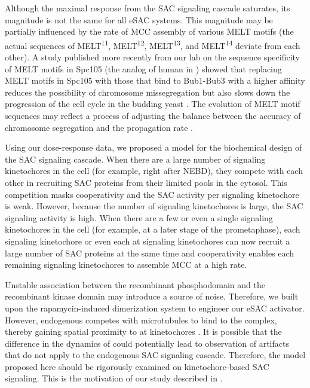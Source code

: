Although the maximal response from the SAC signaling cascade saturates, its magnitude is not the same for all eSAC systems. This magnitude may be partially influenced by the rate of MCC assembly of various MELT motifs (the actual sequences of MELT\textsuperscript{11}, MELT\textsuperscript{12}, MELT\textsuperscript{13}, and MELT\textsuperscript{14} deviate from each other). A study published more recently from our lab on the sequence specificity of MELT motifs in Spc105 (the analog of human  in ) showed that replacing MELT motifs in Spc105 with those that bind to Bub1-Bub3 with a higher affinity reduces the possibility of chromosome missegregation but also slows down the progression of the cell cycle in the budding yeast \cite{YeastMELTSpecificity}. The evolution of MELT motif sequences may reflect a process of adjusting the balance between the accuracy of chromosome segregation and the propagation rate \cite{MELTEvolution}.

Using our dose-response data, we proposed a model for the biochemical design of the SAC signaling cascade. When there are a large number of signaling kinetochores in the cell (for example, right after NEBD), they compete with each other in recruiting SAC proteins from their limited pools in the cytosol. This competition masks cooperativity and the SAC activity per signaling kinetochore is weak. However, because the number of signaling kinetochores is large, the SAC signaling activity is high. When there are a few or even a single signaling kinetochores in the cell (for example, at a later stage of the prometaphase), each signaling kinetochore or even each  at signaling kinetochores can now recruit a large number of SAC proteins at the same time and cooperativity enables each remaining signaling kinetochores to assemble MCC at a high rate.

Unstable association between the recombinant  phosphodomain and the recombinant  kinase domain may introduce a source of noise. Therefore, we built upon the rapamycin-induced dimerization system to engineer our eSAC activator. However, endogenous  competes with microtubules to bind to the  complex, thereby gaining spatial proximity to  at kinetochores \cite{MPS1Localization_Ji, MPS1Localization_Hiruma}. It is possible that the difference in the dynamics of  could potentially lead to observation of artifacts that do not apply to the endogenous SAC signaling cascade. Therefore, the model proposed here should be rigorously examined on kinetochore-based SAC signaling. This is the motivation of our study described in .

